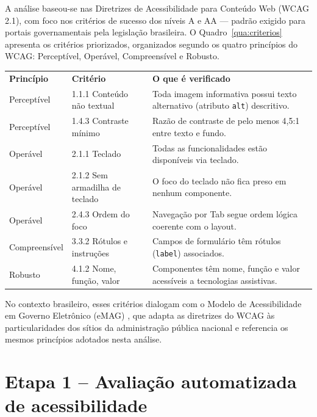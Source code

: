 \documentclass[brazil]{ifpr-pinhais}
\begin{document}
A análise baseou-se nas Diretrizes de Acessibilidade para Conteúdo Web (WCAG 2.1), com foco nos critérios de sucesso dos níveis A e AA --- padrão exigido para portais governamentais pela legislação brasileira. O Quadro~\ref{qua:criterios} apresenta os critérios priorizados, organizados segundo os quatro princípios do WCAG: Perceptível, Operável, Compreensível e Robusto.

\begin{quadro}[htb]
\caption{Critérios WCAG 2.1 (Nível AA) priorizados na análise}
\label{qua:criterios}
\begin{tabular}{p{2.8cm} p{3.8cm} p{6.5cm}}
\rowcolor{headerblue}
\color{white}\textbf{Princípio} & \color{white}\textbf{Critério} & \color{white}\textbf{O que é verificado} \\
Perceptível   & 1.1.1 Conteúdo não textual    & Toda imagem informativa possui texto alternativo (atributo \texttt{alt}) descritivo. \\
Perceptível   & 1.4.3 Contraste mínimo        & Razão de contraste de pelo menos 4,5:1 entre texto e fundo. \\
Operável      & 2.1.1 Teclado                 & Todas as funcionalidades estão disponíveis via teclado. \\
Operável      & 2.1.2 Sem armadilha de teclado & O foco do teclado não fica preso em nenhum componente. \\
Operável      & 2.4.3 Ordem do foco           & Navegação por Tab segue ordem lógica coerente com o layout. \\
Compreensível & 3.3.2 Rótulos e instruções    & Campos de formulário têm rótulos (\texttt{label}) associados. \\
Robusto       & 4.1.2 Nome, função, valor     & Componentes têm nome, função e valor acessíveis a tecnologias assistivas. \\
\end{tabular}
\end{quadro}

No contexto brasileiro, esses critérios dialogam com o Modelo de Acessibilidade em Governo Eletrônico (eMAG) \cite{emag2014}, que adapta as diretrizes do WCAG às particularidades dos sítios da administração pública nacional e referencia os mesmos princípios adotados nesta análise.

\section{Etapa 1 -- Avaliação automatizada de acessibilidade}
\end{document}
